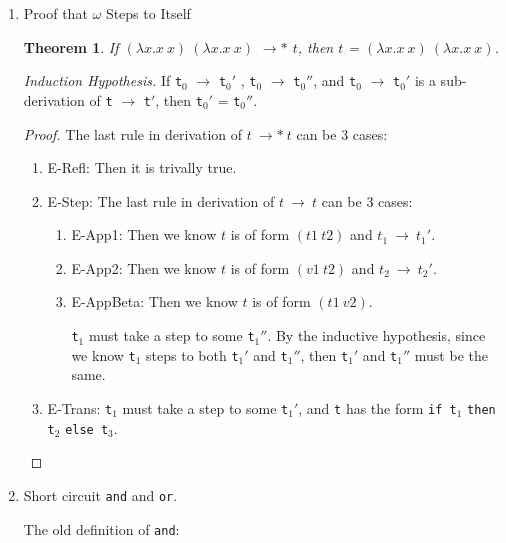 \documentclass{article}
\newtheorem{thm}{Theorem}
\begin{document}
\begin{enumerate}
  \item{Proof that $\omega$ Steps to Itself}
    \begin{thm}If $(\lambda x.x\ x)\ (\lambda x.x\ x)$ $\longrightarrow*$ $t$,
      then $t$ = $(\lambda x.x\ x)\ (\lambda x.x\ x)$.
    \end{thm}

    \textit{Induction Hypothesis.} If \verb|t|$_0$ $\longrightarrow$ \verb|t|$_0'$ , \verb|t|$_0$ $\longrightarrow$ \verb|t|$_0''$, and \verb|t|$_0$ $\longrightarrow$ \verb|t|$_0'$ is a sub-derivation of \verb|t| $\longrightarrow$ \verb|t|$'$, then \verb|t|$_0'$ = \verb|t|$_0''$.

    \begin{proof}
      The last rule in derivation of $t\ \longrightarrow*\ t$ can be 3 cases:
      \begin{enumerate}
      \item E-Refl: Then it is trivally true.

      \item E-Step:
        The last rule in derivation of $t\ \longrightarrow\ t$ can be 3 cases:
        \begin{enumerate}
        \item E-App1: Then we know $t$ is of form $(t1\ t2)$ and $t_1\ \longrightarrow\ t_1'$.
        \item E-App2: Then we know $t$ is of form $(v1\ t2)$ and $t_2\ \longrightarrow\ t_2'$.
        \item E-AppBeta: Then we know $t$ is of form $(t1\ v2)$.

          \verb|t|$_1$ must take a step to some \verb|t|$_1''$. By the inductive hypothesis, since we know \verb|t|$_1$ steps to both \verb|t|$_1'$ and \verb|t|$_1''$,
          then \verb|t|$_1'$ and \verb|t|$_1''$ must be the same.
        \end{enumerate}


      \item E-Trans: \verb|t|$_1$ must take a step to some \verb|t|$_1'$, and \verb|t| has the form
        \verb|if t|$_1$ \verb|then t|$_2$ \verb|else t|$_3$.


      \end{enumerate}
    \end{proof}

    \newpage

  \item Short circuit \verb|and| and \verb|or|.

    The old definition of \verb|and|:\\


\end{enumerate}
\end{document}
